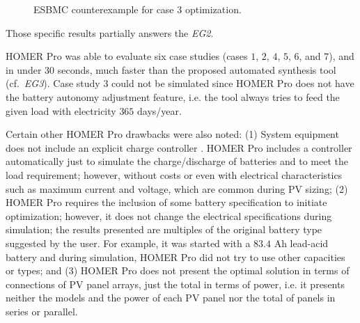 \documentclass[runningheads]{llncs}
\begin{document}
\begin{figure}[h]
\centering
\caption{ESBMC counterexample for case 3 optimization.}
\label{fig:esbmcoptcase3}
\end{figure}

Those specific results partially answers the \textit{EG2}.

HOMER Pro was able to evaluate six case studies (cases $1$, $2$, $4$, $5$, $6$, and $7$), and in under $30$ seconds, much faster than the proposed automated synthesis tool (cf.~\textit{EG3}). Case study $3$ could not be simulated since HOMER Pro does not have the battery autonomy adjustment feature, i.e. the tool always tries to feed the given load with electricity $365$ days/year. 

Certain other HOMER Pro drawbacks were also noted: (1) System equipment does not include an explicit charge controller . HOMER Pro includes a controller automatically just to simulate the charge/discharge of batteries and to meet the load requirement; however, without costs or even with electrical characteristics such as maximum current and voltage, which are common during PV sizing; (2) HOMER Pro requires the inclusion of some battery specification to initiate optimization; however, it does not change the electrical specifications during simulation; the results presented are multiples of the original battery type suggested by the user. For example, it was started with a $83.4$ Ah lead-acid battery and during simulation, HOMER Pro did not try to use other capacities or types; and (3) HOMER Pro does not present the optimal solution in terms of connections of PV panel arrays, just the total in terms of power, i.e. it presents neither the models and the power of each PV panel nor the total of panels in series or parallel.
\end{document}

